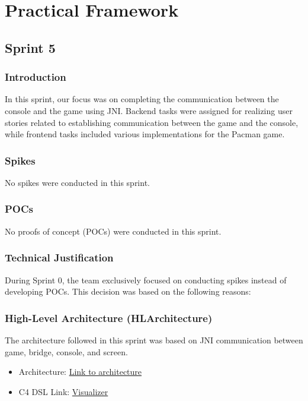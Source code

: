
\section{Practical Framework}

\subsection{Sprint 5}

\subsubsection{Introduction}
In this sprint, our focus was on completing the communication between the console and the game using JNI. Backend tasks were assigned for realizing user stories related to establishing communication between the game and the console, while frontend tasks included various implementations for the Pacman game.

\subsubsection{Spikes}

No spikes were conducted in this sprint.

\subsubsection{POCs}

No proofs of concept (POCs) were conducted in this sprint.

\subsubsection{Technical Justification}

During Sprint 0, the team exclusively focused on conducting spikes instead of developing POCs. This decision was based on the following reasons:

\subsubsection{High-Level Architecture (HLArchitecture)}

The architecture followed in this sprint was based on JNI communication between game, bridge, console, and screen.

\begin{itemize}
    \item Architecture: \href{https://github.com/Pending-Name-21/arquitecture/pull/12}{Link to architecture}
    \item C4 DSL Link: \href{https://structurizr.com/dsl}{Visualizer}
\end{itemize}

